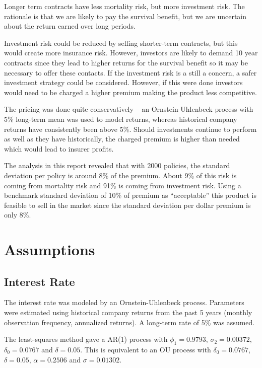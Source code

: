 \documentclass[12pt]{article}
\begin{document}
Longer term contracts have less mortality risk, but more investment risk. The rationale is that we are likely to pay the survival benefit, but we are uncertain about the return earned over long periods.

Investment risk could be reduced by selling shorter-term contracts, but this would create more insurance risk. However, investors are likely to demand 10 year contracts since they lead to higher returns for the survival benefit so it may be necessary to offer these contacts. If the investment risk is a still a concern, a safer investment strategy could be considered. However, if this were done investors would need to be charged a higher premium making the product less competitive.

The pricing was done quite conservatively -- an Ornstein-Uhlenbeck process with 5\% long-term mean was used to model returns, whereas historical company returns have consistently been above 5\%. Should investments continue to perform as well as they have historically, the charged premium is higher than needed which would lead to insurer profits.

The analysis in this report revealed that with 2000 policies, the standard deviation per policy is around 8\% of the premium. About 9\% of this risk is coming from mortality risk and 91\% is coming from investment risk. Using a benchmark standard deviation of 10\% of premium as ``acceptable'' this product is feasible to sell in the market since the standard deviation per dollar premium is only 8\%.

\section{Assumptions}

\subsection{Interest Rate}

The interest rate was modeled by an Ornstein-Uhlenbeck process. Parameters were estimated using historical company returns from the past 5 years (monthly observation frequency, annualized returns). A long-term rate of 5\% was assumed.

The least-squares method gave a AR(1) process with $\phi_{1} = 0.9793$, $\sigma_{2} =  0.00372$, $\delta_{0} = 0.0767$ and $\delta = 0.05$. This is equivalent to an OU process with $\delta_{0} = 0.0767$, $\delta = 0.05$, $\alpha = 0.2506$ and $\sigma = 0.01302$.
\end{document}

